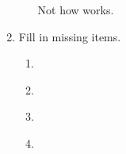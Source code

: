 \begin{enumerate}
\begin{enumerate}
\begin{argumentN}[1]



\end{argumentN}

\opts{

 \dotline
 \dotline
}
{Not how \condI{} works.}

\end{enumerate}
\newpage

\item Fill in missing items.

 \begin{enumerate}
  \renewcommand{\labelenumii}{(\roman{enumii})}

 \setlength{\itemsep}{2em}
 \item
\begin{argumentN}[1]



\end{argumentN}


\item

\begin{argumentN}[1]



\end{argumentN}

\item 
\begin{argumentN}[1]



\end{argumentN}



\item 
\begin{argumentN}[1]



\end{argumentN}
\end{enumerate}
\end{enumerate}
